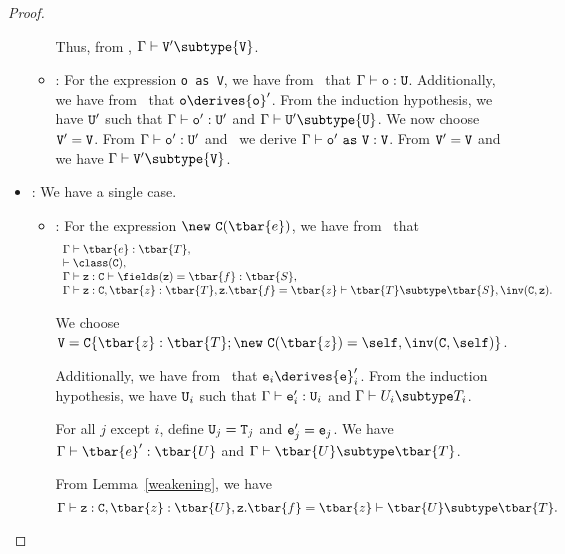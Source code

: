 \begin{proof}
\begin{itemize}
\begin{itemize}
        Thus,
            from , $\Gamma \vdash {\tt V}' \subtype {\tt V}$.
   \item
   \RCCast: For the expression {\tt o~as~V}, we have from \TCast\ that
            $\Gamma \vdash {\tt o}: {\tt U}$.
            Additionally, we have from \RCCast\ that
            ${\tt o} \derives {{\tt o}}'$.
            From the induction hypothesis, we have ${\tt U}'$ such that
            $\Gamma \vdash {\tt o}': {\tt U}'$ and
            $\Gamma \vdash {\tt U}' \subtype {\tt U}$.
            We now choose ${\tt V}'={\tt V}$.
            From $\Gamma \vdash {\tt o}': {\tt U}'$ and \TCast\ we derive
            $\Gamma \vdash {\tt o}'{\tt ~as~V} : {\tt V}$.
            From ${\tt V}'={\tt V}$ and 
            we have $\Gamma \vdash {\tt V}' \subtype {\tt V}$.
   \end{itemize}
\item
\TNew: We have a single case.
   \begin{itemize}
   \item
   \RCNewArg: For the expression ${\new\ {\tt C}(\tbar{e})}$,
            we have from \TNew\ that
            $$
            \begin{array}{l}
            \Gamma \vdash \tbar{e}: \tbar{T}, \\
            \vdash \class({\tt C}), \\
            \Gamma \vdash {\tt z}: {\tt C} \vdash \fields({\tt z}) = \tbar{f}: \tbar{S}, \\
            \Gamma \vdash {\tt z}: {\tt C}, \tbar{z}: \tbar{T}, {\tt z}.\tbar{f} = \tbar{z} \vdash \tbar{T} \subtype \tbar{S}, \inv({\tt C}, {\tt z}).
            \end{array}$$

            We choose
            ${\tt V} = {\tt C}\{ \tbar{z}: \tbar{T}; \new\ {\tt C}(\tbar{z}) = \self, \inv({\tt C}, \self)\}$.

            Additionally, we have from \RCNewArg\ that
            ${\tt e}_i \derives {{\tt e}}_i'$.
            From the induction hypothesis, we have ${\tt U}_i$ such that
            $\Gamma \vdash {\tt e}_i': {{\tt U}}_i$ and 
            $\Gamma \vdash U_i \subtype T_i$.

            For all $j$ except $i$, define ${\tt U}_j = {\tt T}_j$ and ${\tt e}_j' = {\tt e}_j$.
            We have 
            $\Gamma \vdash \tbar{e}': \tbar{U}$ and
            $\Gamma \vdash \tbar{U} \subtype \tbar{T}$.

            From Lemma~\ref{weakening}, we have
            $$\Gamma \vdash {\tt z}: {\tt C}, \tbar{z}: \tbar{U}, {\tt z}.\tbar{f} = \tbar{z} \vdash \tbar{U} \subtype \tbar{T}.$$


\end{itemize}
\end{itemize}
\end{proof}
